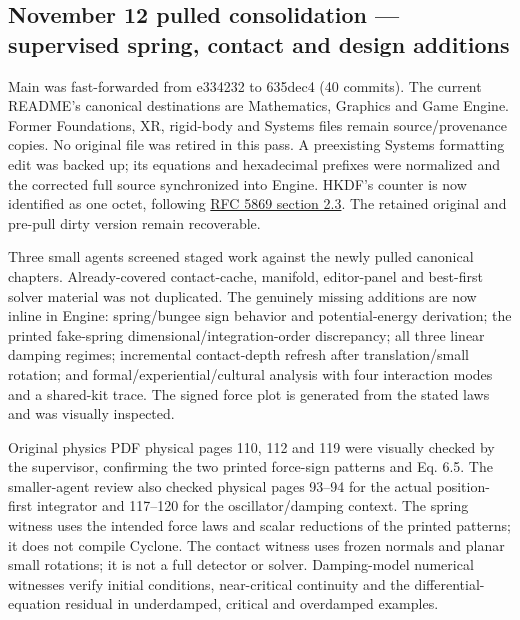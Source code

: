 \subsection{November 12 pulled consolidation --- supervised spring, contact and design additions}\label{appendix-a103e7846d21-november-12-pulled-consolidation-supervised-spring-contact-and-design-additions}

\hypertarget{appendix-a103e7846d21-november-12-pulled-consolidation-supervised-spring-contact-and-design-additions}{}

Main was fast-forwarded from e334232 to 635dec4 (40 commits). The current README's canonical destinations are Mathematics, Graphics and Game Engine. Former Foundations, XR, rigid-body and Systems files remain source/provenance copies. No original file was retired in this pass. A preexisting Systems formatting edit was backed up; its equations and hexadecimal prefixes were normalized and the corrected full source synchronized into Engine. HKDF's counter is now identified as one octet, following \href{https://www.rfc-editor.org/rfc/rfc5869.html\#section-2.3}{RFC 5869 section 2.3}. The retained original and pre-pull dirty version remain recoverable.

Three small agents screened staged work against the newly pulled canonical chapters. Already-covered contact-cache, manifold, editor-panel and best-first solver material was not duplicated. The genuinely missing additions are now inline in Engine: spring/bungee sign behavior and potential-energy derivation; the printed fake-spring dimensional/integration-order discrepancy; all three linear damping regimes; incremental contact-depth refresh after translation/small rotation; and formal/experiential/cultural analysis with four interaction modes and a shared-kit trace. The signed force plot is generated from the stated laws and was visually inspected.

Original physics PDF physical pages 110, 112 and 119 were visually checked by the supervisor, confirming the two printed force-sign patterns and Eq. 6.5. The smaller-agent review also checked physical pages 93--94 for the actual position-first integrator and 117--120 for the oscillator/damping context. The spring witness uses the intended force laws and scalar reductions of the printed patterns; it does not compile Cyclone. The contact witness uses frozen normals and planar small rotations; it is not a full detector or solver. Damping-model numerical witnesses verify initial conditions, near-critical continuity and the differential-equation residual in underdamped, critical and overdamped examples.

